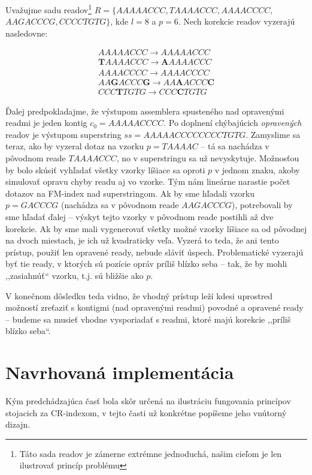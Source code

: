 \begin{example}
Uvažujme sadu readov\footnote{Táto sada readov je zámerne extrémne jednoduchá, našim cieľom je len ilustrovať princíp problému} $R=\{AAAAACCC, TAAAACCC, AAAACCCC,$ \\ $ AAGACCCG, CCCCTGTG\}$, kde $l=8$ a $p=6$. Nech korekcie readov vyzerajú nasledovne:

\begin{align*}
AAAAACCC \rightarrow AAAAACCC \\
\mathbf{T}AAAACCC \rightarrow \mathbf{A}AAAACCC \\
AAAACCCC \rightarrow AAAACCCC \\
AA \mathbf{G} ACCC \mathbf{G} \rightarrow AA \mathbf{A} ACCC \mathbf{C} \\
CCC \mathbf{T} TGTG \rightarrow CCC \mathbf{C} TGTG
\end{align*}

Ďalej predpokladajme, že výstupom assemblera spusteného nad opravenými readmi je jeden kontig $c_0=AAAAACCCC$. Po doplnení chýbajúcich \emph{opravených} readov je výstupom superstring $ss=AAAAACCCCCCCCTGTG$. Zamyslime sa teraz, ako by vyzeral dotaz na vzorku $p=TAAAAC$ -- tá sa nachádza v pôvodnom reade $TAAAACCC$, no v superstringu sa už nevyskytuje. Možnosťou by bolo skúsiť vyhľadať všetky vzorky líšiace sa oproti $p$ v jednom znaku, akoby simulovať opravu chyby readu aj vo vzorke. Tým nám lineárne narastie počet dotazov na FM-index nad superstringom. Ak by sme hľadali vzorku $p=GACCCG$ (nachádza sa v pôvodnom reade $AAGACCCG$), potrebovali by sme hľadať ďalej -- výskyt tejto vzorky v pôvodnom reade postihli až dve korekcie. Ak by sme mali vygenerovať všetky možné vzorky líšiace sa od pôvodnej na dvoch miestach, je ich už kvadraticky veľa. Vyzerá to teda, že ani tento prístup, použiť len opravené ready, nebude sláviť úspech. Problematické vyzerajú byť tie ready, v ktorých sú pozície opráv príliš blízko seba -- tak, že by mohli ,,zasiahnúť`` vzorku, t.j. sú bližšie ako $p$.
\end{example}

V konečnom dôsledku teda vidno, že vhodný prístup leží kdesi uprostred možností zreťaziť s kontigmi (nad opravenými readmi) povodné a opravené ready -- budeme sa musieť vhodne vysporiadať s readmi, ktoré majú korekcie ,,príliš blízko seba``.

\section{Navrhovaná implementácia}
Kým predchádzajúca časť bola skôr určená na ilustráciu fungovania princípov stojacich za CR-indexom, v tejto časti už konkrétne popíšeme jeho vnútorný dizajn.

